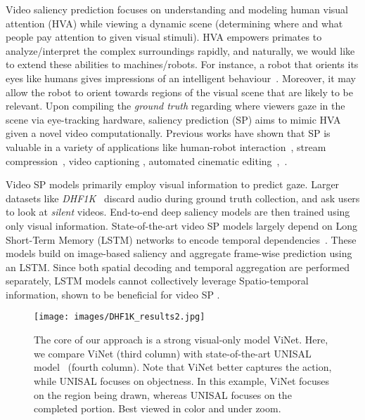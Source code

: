 \documentclass[letterpaper, 10 pt, conference]{ieeeconf}  \usepackage{times}
\begin{document}
Video saliency prediction focuses on understanding and modeling human visual attention (HVA) while viewing a dynamic scene (determining where and what people pay attention to given visual stimuli). HVA empowers primates to analyze/interpret the complex surroundings rapidly, and naturally, we would like to extend these abilities to machines/robots. For instance, a robot that orients its eyes like humans gives impressions of an intelligent behaviour~\cite{butko2008visual}. Moreover, it may allow the robot to orient towards regions of the visual scene that are likely to be relevant. Upon compiling the \emph{ground truth} regarding where viewers gaze in the scene via eye-tracking hardware, saliency prediction (SP) aims to mimic HVA given a novel video computationally. Previous works have shown that SP is valuable in a variety of applications like human-robot interaction~\cite{ferreira2014attentional}, stream compression~\cite{hadizadeh2013saliency}, video captioning \cite{nguyen2013static}, automated cinematic editing~\cite{moorthy2020gazed},~\etc.

Video SP models primarily employ visual information to predict gaze. Larger datasets like \emph{DHF1K}~\cite{wang2018revisiting} discard audio during ground truth collection, and ask users to look at \emph{silent} videos. End-to-end deep saliency models are then trained using only visual information. State-of-the-art video SP models largely depend on Long Short-Term Memory (LSTM) networks to encode temporal dependencies~\cite{droste2020unified, wu2020salsac, linardos2019simple}. These models build on image-based saliency and aggregate frame-wise prediction using an LSTM. Since both spatial decoding and temporal aggregation are performed separately, LSTM models cannot collectively leverage Spatio-temporal information, shown to be beneficial for video SP \cite{min2019tased}.


\begin{figure}[t]
\centering
\texttt{[image: images/DHF1K\_results2.jpg]}
\caption{{The core of our approach is a strong visual-only model ViNet. Here, we compare ViNet (third column) with state-of-the-art UNISAL model~\cite{droste2020unified} (fourth column). Note that ViNet better captures the action, while UNISAL focuses on objectness. In this example, ViNet focuses on the region being drawn, whereas UNISAL focuses on the completed portion. Best viewed in color and under zoom.}}\vspace{-.1cm}
\label{fig:DHF1K_results}
\end{figure}
\end{document}
